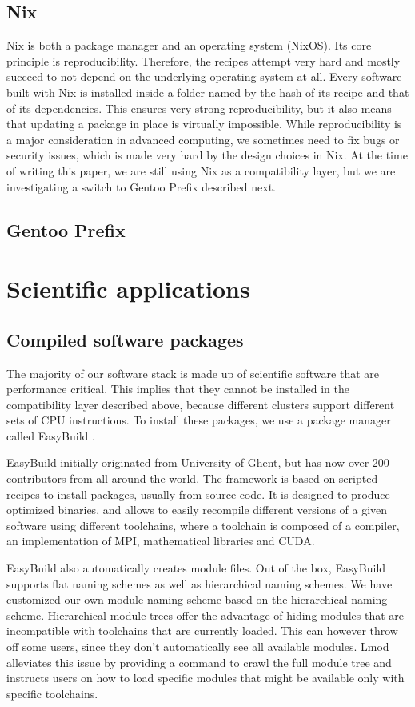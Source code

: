 \documentclass[sigconf]{acmart}
\begin{document}
\subsection{Nix}
Nix \cite{Nix} is both a package manager and an operating system (NixOS). Its core principle is reproducibility. Therefore, the recipes attempt very hard and mostly succeed to not depend on the underlying operating system at all. Every software built with Nix is installed inside a folder named by the hash of its recipe and that of its dependencies. This ensures very strong reproducibility, but it also means that updating a package in place is virtually impossible. While reproducibility is a major consideration in advanced computing, we sometimes need to fix bugs or security issues, which is made very hard by the design choices in Nix. At the time of writing this paper, we are still using Nix as a compatibility layer, but we are investigating a switch to Gentoo Prefix described next. 

\subsection{Gentoo Prefix}

\section{Scientific applications}

\subsection{Compiled software packages}
The majority of our software stack is made up of scientific software that are performance critical. This implies that they cannot be installed in the compatibility layer described above, because different clusters support different sets of CPU instructions. To install these packages, we use a package manager called EasyBuild \cite{EasyBuild2012,EasyBuild2014,EasyBuild2016}. 

EasyBuild initially originated from University of Ghent, but has now over 200 contributors from all around the world. The framework is based on scripted recipes to install packages, usually from source code. It is designed to produce optimized binaries, and allows to easily recompile different versions of a given software using different toolchains, where a toolchain is composed of a compiler, an implementation of MPI, mathematical libraries and CUDA. 

EasyBuild also automatically creates module files. Out of the box, EasyBuild supports flat naming schemes as well as hierarchical naming schemes. We have customized our own module naming scheme based on the hierarchical naming scheme. Hierarchical module trees offer the advantage of hiding modules that are incompatible with toolchains that are currently loaded. This can however throw off some users, since they don’t automatically see all available modules. Lmod \cite{Lmod} alleviates this issue by providing a command to crawl the full module tree and instructs users on how to load specific modules that might be available only with specific toolchains.
\end{document}
